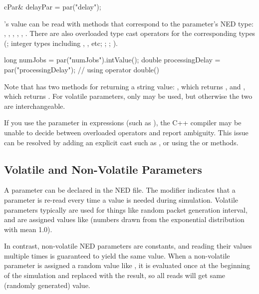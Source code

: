 \begin{cpp}
cPar& delayPar = par("delay");
\end{cpp}

's value can be read with methods that correspond to
the parameter's NED type: , ,
, , ,
.
There are also overloaded type cast operators for the corresponding types
(; integer types including , , etc;
; ; ).

\begin{cpp}
long numJobs = par("numJobs").intValue();
double processingDelay = par("processingDelay"); // using operator double()
\end{cpp}

Note that  has two methods for returning a string value:
, which returns , and
, which returns .
For volatile parameters, only  may be used,
but otherwise the two are interchangeable.

If you use the  parameter in expressions (such as
), the C++ compiler may be unable to decide
between overloaded operators and report ambiguity. This issue can be
resolved by adding an explicit cast such as ,
or using the  or  methods.


\subsection{Volatile and Non-Volatile Parameters}
\label{sec:simple-modules:volatile-parameters}

A parameter can be declared  in the NED file. The 
modifier indicates that a parameter is re-read every time a value is needed
during simulation. Volatile parameters typically are used for things like
random packet generation interval, and are assigned values like 
(numbers drawn from the exponential distribution with mean 1.0).

In contrast, non-volatile NED parameters are constants, and reading their
values multiple times is guaranteed to yield the same value. When a non-volatile
parameter is assigned a random value like , it is
evaluated once at the beginning of the simulation and replaced with the result,
so all reads will get same (randomly generated) value.

